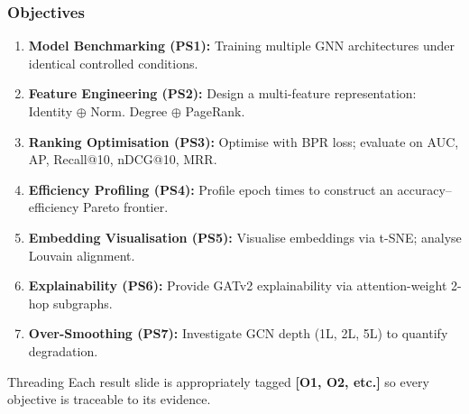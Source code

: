 \documentclass[10pt,aspectratio=43]{beamer}
\begin{document}
\begin{frame}
\frametitle{Objectives}
\begin{enumerate}
  \small
  \item[\textbf{O1}] \textbf{Model Benchmarking (PS1):} Training multiple GNN architectures under identical controlled conditions.
  \item[\textbf{O2}] \textbf{Feature Engineering (PS2):} Design a multi-feature representation: Identity $\oplus$ Norm. Degree $\oplus$ PageRank.
  \item[\textbf{O3}] \textbf{Ranking Optimisation (PS3):} Optimise with BPR loss; evaluate on AUC, AP, Recall@10, nDCG@10, MRR.
  \item[\textbf{O4}] \textbf{Efficiency Profiling (PS4):} Profile epoch times to construct an accuracy--efficiency Pareto frontier.
  \item[\textbf{O5}] \textbf{Embedding Visualisation (PS5):} Visualise embeddings via t-SNE; analyse Louvain alignment.
  \item[\textbf{O6}] \textbf{Explainability (PS6):} Provide GATv2 explainability via attention-weight 2-hop subgraphs.
  \item[\textbf{O7}] \textbf{Over-Smoothing (PS7):} Investigate GCN depth (1L, 2L, 5L) to quantify degradation.
\end{enumerate}

\vspace{0.2em}
\begin{block}{Threading}
  \small Each result slide is appropriately tagged \textbf{[O1, O2, etc.]} so every objective is traceable to its evidence.
\end{block}
\end{frame}
\end{document}
